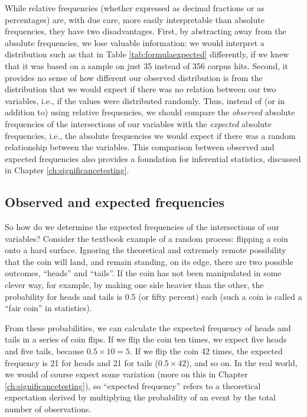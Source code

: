 While relative frequencies (whether expressed as decimal fractions or as percentages) are, with due care, more easily interpretable than absolute frequencies, they have two disadvantages. First, by abstracting away from the absolute frequencies, we lose valuable information: we would interpret a distribution such as that in Table \ref{tab:formulaexpected} differently, if we knew that it was based on a sample on just 35 instead of 356 corpus hits. Second, it provides no sense of how different our observed distribution is from the distribution that we would expect if there was no relation between our two variables, i.e., if the values were distributed randomly. Thus, instead of (or in addition to) using relative frequencies, we should compare the \emph{observed} absolute frequencies of the intersections of our variables with the \emph{expected} absolute frequencies, i.e., the absolute frequencies we would expect if there was a random relationship between the variables. This comparison between observed and expected frequencies also provides a foundation for inferential statistics, discussed in Chapter \ref{ch:significancetesting}.

\subsection{Observed and expected frequencies}
\label{sec:observedexpected}

So how do we determine the expected frequencies of the intersections of our variables? Consider the textbook example of a random process: flipping a coin onto a hard surface. Ignoring the theoretical and extremely remote possibility that the coin will land, and remain standing, on its edge, there are two possible outcomes, ``heads'' and ``tails''. If the coin has not been manipulated in some clever way, for example, by making one side heavier than the other, the probability for heads and tails is 0.5 (or fifty percent) each (such a coin is called a ``fair coin'' in statistics).

From these probabilities, we can calculate the expected frequency of heads and tails in a series of coin flips. If we flip the coin ten times, we expect five heads and five tails, because $0.5 \times 10 = 5$. If we flip the coin 42 times, the expected frequency is 21 for heads and 21 for tails ($0.5 \times 42$), and so on. In the real world, we would of course expect some variation (more on this in Chapter \ref{ch:significancetesting}), so ``expected frequency'' refers to a theoretical expectation derived by multiplying the probability of an event by the total number of observations.

